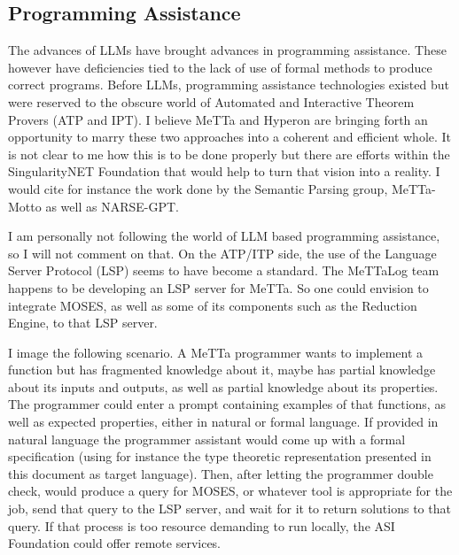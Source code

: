 \documentclass[]{report}
\begin{document}

\subsection{Programming Assistance}

The advances of LLMs have brought advances in programming assistance.
These however have deficiencies tied to the lack of use of formal
methods to produce correct programs.  Before LLMs, programming
assistance technologies existed but were reserved to the obscure world
of Automated and Interactive Theorem Provers (ATP and IPT).  I believe
MeTTa and Hyperon are bringing forth an opportunity to marry these two
approaches into a coherent and efficient whole.  It is not clear to me
how this is to be done properly but there are efforts within the
SingularityNET Foundation that would help to turn that vision into a
reality.  I would cite for instance the work done by the Semantic
Parsing group, MeTTa-Motto as well as NARSE-GPT.

I am personally not following the world of LLM based programming
assistance, so I will not comment on that.  On the ATP/ITP side, the
use of the Language Server Protocol (LSP) seems to have become a
standard.  The MeTTaLog team happens to be developing an LSP server
for MeTTa.  So one could envision to integrate MOSES, as well as some
of its components such as the Reduction Engine, to that LSP server.

I image the following scenario.  A MeTTa programmer wants to implement
a function but has fragmented knowledge about it, maybe has partial
knowledge about its inputs and outputs, as well as partial knowledge
about its properties.  The programmer could enter a prompt containing
examples of that functions, as well as expected properties, either in
natural or formal language.  If provided in natural language the
programmer assistant would come up with a formal specification (using
for instance the type theoretic representation presented in this
document as target language).  Then, after letting the programmer
double check, would produce a query for MOSES, or whatever tool is
appropriate for the job, send that query to the LSP server, and wait
for it to return solutions to that query.  If that process is too
resource demanding to run locally, the ASI Foundation could offer
remote services.
\end{document}
